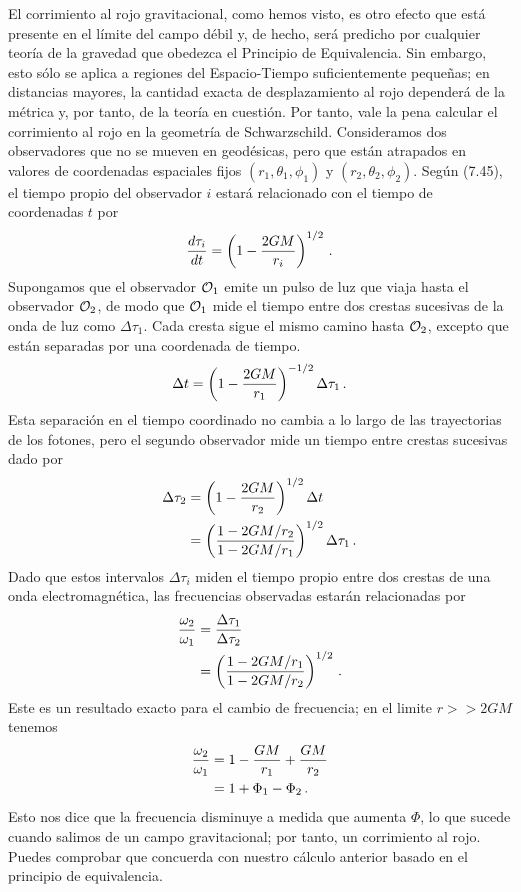 \documentclass[11pt,b5paper,openany,twoside]{book}
\begin{document}
El corrimiento al rojo gravitacional, como hemos visto, es otro efecto que está presente en el límite del campo débil y, de hecho, será predicho por cualquier teoría de la gravedad que obedezca el Principio de Equivalencia.
Sin embargo, esto sólo se aplica a regiones del Espacio-Tiempo suficientemente pequeñas; en distancias mayores, la cantidad exacta de desplazamiento al rojo dependerá de la métrica y, por tanto, de la teoría en cuestión.
Por tanto, vale la pena calcular el corrimiento al rojo en la geometría de Schwarzschild.
Consideramos dos observadores que no se mueven en geodésicas, pero que están atrapados en valores de coordenadas espaciales fijos $(r_1,\theta_1,\phi_1)$ y $(r_2,\theta_2,\phi_2)$.
Según (7.45), el tiempo propio del observador $i$ estará relacionado con el tiempo de coordenadas $t$ por
\begin{equation}
{{d\tau_i}\over{dt}} = \left(1-{{2GM}\over{r_i}}\right)^{1/2}\,.
\label{7.58}
\end{equation}
Supongamos que el observador ${\cal O}_1$ emite un pulso de luz que viaja hasta el observador ${\cal O}_2$, de modo que ${\cal O}_1$ mide el tiempo entre dos crestas sucesivas de la onda de luz como $\Delta\tau_1$.
Cada cresta sigue el mismo camino hasta ${\cal O}_2$, excepto que están separadas por una coordenada de tiempo.
\begin{equation}
\Delta t= \left(1-{{2GM}\over{r_1}}\right)^{-1/2}\Delta \tau_1\,.
\label{7.59}
\end{equation}
Esta separación en el tiempo coordinado no cambia a lo largo de las trayectorias de los fotones, pero el segundo observador mide un tiempo entre crestas sucesivas dado por
\begin{align}
\Delta\tau_2  &=  \left(1-{{2GM}\over{r_2}}\right)^{1/2}
\Delta t \notag \\
&=  \left({{1-{{2GM}/{r_2}}}\over{1-{{2GM}/{r_1}}}}\right)^{1/2}
\Delta\tau_1\,.\label{7.60}
\end{align}
Dado que estos intervalos $\Delta\tau_i$ miden el tiempo propio entre dos crestas de una onda electromagnética, las frecuencias observadas estarán relacionadas por
\begin{align}
{{\omega_2}\over{\omega_1}} &=  {{\Delta\tau_1}\over
{\Delta\tau_2}} \notag \\
&=  \left({{1-{{2GM}/{r_1}}}\over{1-{{2GM}/{r_2}}}}\right)^{1/2}
\,.\label{7.61}
\end{align}
Este es un resultado exacto para el cambio de frecuencia; en el limite $r>>2GM$ tenemos
\begin{align}
{{\omega_2}\over{\omega_1}} &=  1-{{GM}\over{r_1}}+
{{GM}\over{r_2}} \notag \\
&=  1+\Phi_1-\Phi_2\,.\label{7.62}
\end{align}
Esto nos dice que la frecuencia disminuye a medida que aumenta $\Phi$, lo que sucede cuando salimos de un campo gravitacional; por tanto, un corrimiento al rojo.
Puedes comprobar que concuerda con nuestro cálculo anterior basado en el principio de equivalencia.
\end{document}
